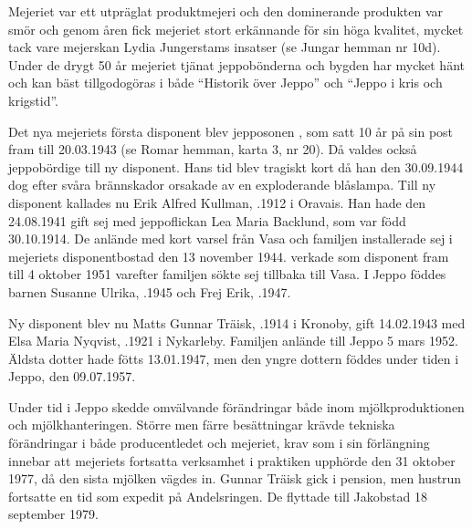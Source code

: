 
Mejeriet var ett utpräglat produktmejeri och den dominerande produkten var smör och genom åren fick mejeriet stort erkännande för sin höga kvalitet, mycket tack vare mejerskan Lydia Jungerstams insatser (se Jungar hemman nr 10d). Under de drygt 50 år mejeriet tjänat jeppobönderna och bygden har mycket hänt och kan bäst tillgodogöras i både ``Historik över Jeppo'' och ``Jeppo i kris och krigstid''.

Det nya mejeriets första disponent blev jepposonen , som satt 10 år på sin post fram till 20.03.1943 (se Romar hemman, karta 3, nr 20). Då valdes också jeppobördige  till ny disponent. Hans tid blev tragiskt kort då han den 30.09.1944 dog efter svåra brännskador orsakade av en exploderande blåslampa. Till ny disponent kallades nu Erik Alfred Kullman, .1912 i Oravais. Han hade  den 24.08.1941 gift sej med jeppoflickan Lea Maria Backlund, som var född 30.10.1914. De anlände med kort varsel från Vasa och familjen installerade sej i mejeriets disponentbostad den 13 november 1944.  verkade som disponent fram till 4 oktober 1951 varefter familjen sökte sej tillbaka till Vasa. I Jeppo föddes barnen Susanne Ulrika, .1945 och Frej Erik, .1947.


Ny disponent blev nu Matts Gunnar Träisk, .1914 i Kronoby, gift 14.02.1943 med Elsa Maria Nyqvist, .1921 i Nykarleby. Familjen anlände till Jeppo 5 mars 1952. Äldsta dotter  hade fötts 13.01.1947, men den yngre dottern  föddes under tiden i Jeppo, den 09.07.1957.

Under  tid i Jeppo skedde omvälvande förändringar både inom mjölkproduktionen och mjölkhanteringen. Större men färre besättningar krävde tekniska förändringar i både producentledet och mejeriet, krav som i sin förlängning innebar att mejeriets fortsatta verksamhet i praktiken upphörde den 31 oktober 1977, då den sista mjölken vägdes in. Gunnar Träisk gick i pension, men hustrun  fortsatte en tid som expedit på Andelsringen. De flyttade till Jakobstad 18 september 1979.


